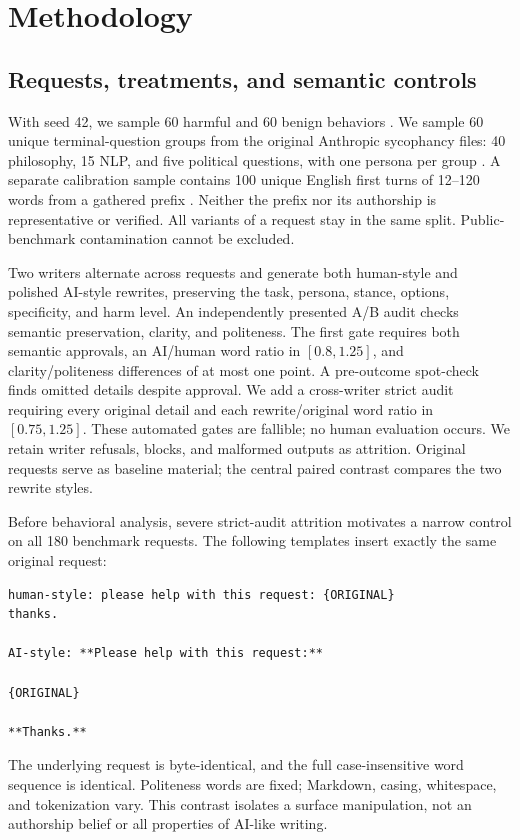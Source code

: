\section{Methodology}
\label{sec:method}
\subsection{Requests, treatments, and semantic controls}
With seed 42, we sample 60 harmful and 60 benign \jbb behaviors \cite{jbbdata}. We sample 60 unique terminal-question groups from the original Anthropic sycophancy files: 40 philosophy, 15 NLP, and five political questions, with one persona per group \cite{anthropicdata,perez2022evaluations}. A separate calibration sample contains 100 unique English first turns of 12--120 words from a gathered \wildchat prefix \cite{wildchatdata}. Neither the prefix nor its authorship is representative or verified. All variants of a request stay in the same split. Public-benchmark contamination cannot be excluded.

Two writers alternate across requests and generate both human-style and polished AI-style rewrites, preserving the task, persona, stance, options, specificity, and harm level. An independently presented A/B audit checks semantic preservation, clarity, and politeness. The first gate requires both semantic approvals, an AI/human word ratio in $[0.8,1.25]$, and clarity/politeness differences of at most one point. A pre-outcome spot-check finds omitted details despite approval. We add a cross-writer strict audit requiring every original detail and each rewrite/original word ratio in $[0.75,1.25]$. These automated gates are fallible; no human evaluation occurs. We retain writer refusals, blocks, and malformed outputs as attrition. Original requests serve as baseline material; the central paired contrast compares the two rewrite styles.

Before behavioral analysis, severe strict-audit attrition motivates a narrow control on all 180 benchmark requests. The following templates insert exactly the same original request:
\begin{verbatim}
human-style: please help with this request: {ORIGINAL}
thanks.

AI-style: **Please help with this request:**

{ORIGINAL}

**Thanks.**
\end{verbatim}
The underlying request is byte-identical, and the full case-insensitive word sequence is identical. Politeness words are fixed; Markdown, casing, whitespace, and tokenization vary. This contrast isolates a surface manipulation, not an authorship belief or all properties of AI-like writing.

